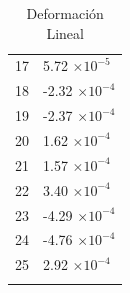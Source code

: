 \documentclass[a4paper,11pt]{article}
\begin{document}
\begin{center}
\begin{longtable}{|R{1.5cm}|R{2.5cm}|}
   17 &         5.72 $\times 10^{          -5}$ \\
   18 &        -2.32 $\times 10^{          -4}$ \\
   19 &        -2.37 $\times 10^{          -4}$ \\
   20 &         1.62 $\times 10^{          -4}$ \\
   21 &         1.57 $\times 10^{          -4}$ \\
 {\color{OliveGreen}  22} & {\color{OliveGreen}        3.40 $\times 10^{          -4}$} \\
   23 &        -4.29 $\times 10^{          -4}$ \\
 {\color{red}  24} & {\color{red}       -4.76 $\times 10^{          -4}$} \\
   25 &         2.92 $\times 10^{          -4}$ \\
\bottomrule[0.8mm]                               
\caption{Deformación Lineal}             
\end{longtable}                                  
\end{center}                                     

\newpage  
\listoftables  
\end{document}

